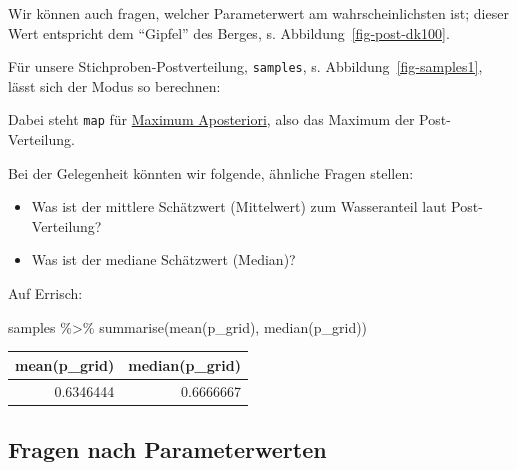 \documentclass[
  a4paper,
  DIV=11]{scrreprt}
\newenvironment{Shaded}{\begin{snugshade}}{\end{snugshade}}
\newcommand{\DocumentationTok}[1]{\textcolor[rgb]{0.37,0.37,0.37}{\textit{#1}}}
\newcommand{\FunctionTok}[1]{\textcolor[rgb]{0.28,0.35,0.67}{#1}}
\newcommand{\NormalTok}[1]{\textcolor[rgb]{0.00,0.23,0.31}{#1}}
\newcommand{\SpecialCharTok}[1]{\textcolor[rgb]{0.37,0.37,0.37}{#1}}
\providecommand{\tightlist}{%
  \setlength{\itemsep}{0pt}\setlength{\parskip}{0pt}}\usepackage{longtable,booktabs,array}
\theoremstyle{definition}
\theoremstyle{remark}
\begin{document}
Wir können auch fragen, welcher Parameterwert am wahrscheinlichsten ist;
dieser Wert entspricht dem ``Gipfel'' des Berges, s.
Abbildung~\ref{fig-post-dk100}.

Für unsere Stichproben-Postverteilung, \texttt{samples}, s.
Abbildung~\ref{fig-samples1}, lässt sich der Modus so berechnen:

\begin{Shaded}
\end{Shaded}

Dabei steht \texttt{map} für
\href{https://easystats.github.io/bayestestR/reference/map_estimate.html}{Maximum
Aposteriori}, also das Maximum der Post-Verteilung.

Bei der Gelegenheit könnten wir folgende, ähnliche Fragen stellen:

\begin{itemize}
\tightlist
\item
  Was ist der mittlere Schätzwert (Mittelwert) zum Wasseranteil laut
  Post-Verteilung?
\item
  Was ist der mediane Schätzwert (Median)?
\end{itemize}

Auf Errisch:

\begin{Shaded}
\begin{Highlighting}[]
\NormalTok{samples }\SpecialCharTok{\%\textgreater{}\%} 
  \FunctionTok{summarise}\NormalTok{(}\FunctionTok{mean}\NormalTok{(p\_grid),}
            \FunctionTok{median}\NormalTok{(p\_grid))}
\end{Highlighting}
\end{Shaded}

\begin{longtable}[]{@{}rr@{}}
\toprule()
mean(p\_grid) & median(p\_grid) \\
\midrule()
\endhead
0.6346444 & 0.6666667 \\
\bottomrule()
\end{longtable}

\hypertarget{fragen-nach-parameterwerten}{%
\subsection{Fragen nach
Parameterwerten}\label{fragen-nach-parameterwerten}}
\end{document}

